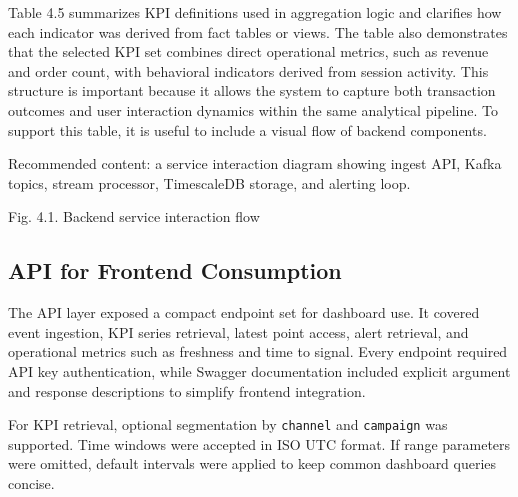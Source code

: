 Table 4.5 summarizes KPI definitions used in aggregation logic and clarifies how each indicator was derived from fact tables or views. 
The table also demonstrates that the selected KPI set combines direct operational metrics, such as revenue and order count, 
with behavioral indicators derived from session activity. 
This structure is important because it allows the system to capture both transaction outcomes and user interaction dynamics within the same analytical pipeline. 
To support this table, it is useful to include a visual flow of backend components.

\begin{center}
\vspace{0.4em}
Recommended content: a service interaction diagram showing ingest API, Kafka topics, stream processor, TimescaleDB storage, and alerting loop.

Fig. 4.1. Backend service interaction flow
\end{center}

\subsection{API for Frontend Consumption}
The API layer exposed a compact endpoint set for dashboard use. It covered event ingestion, KPI series retrieval, latest point access, alert retrieval, and operational metrics such as freshness and time to signal. Every endpoint required API key authentication, while Swagger documentation included explicit argument and response descriptions to simplify frontend integration.

For KPI retrieval, optional segmentation by \texttt{channel} and \texttt{campaign} was supported. Time windows were accepted in ISO UTC format. If range parameters were omitted, default intervals were applied to keep common dashboard queries concise.

